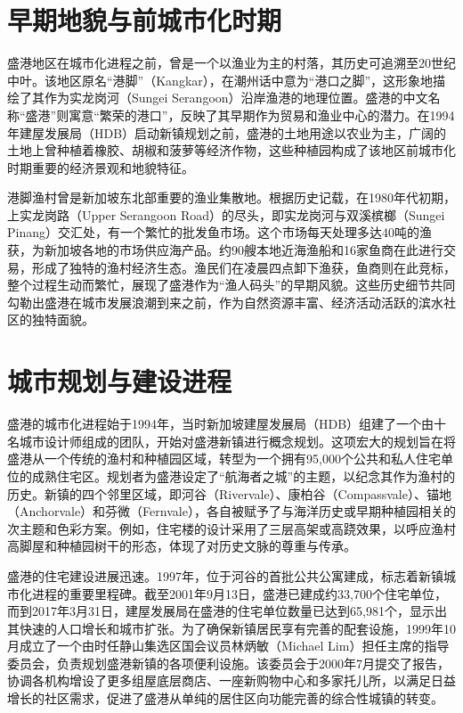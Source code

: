 \documentclass[11pt,a4paper,twoside,openany]{book}
\begin{document}
\section{早期地貌与前城市化时期}
盛港地区在城市化进程之前，曾是一个以渔业为主的村落，其历史可追溯至20世纪中叶。该地区原名“港脚”（Kangkar），在潮州话中意为“港口之脚”，这形象地描绘了其作为实龙岗河（Sungei Serangoon）沿岸渔港的地理位置。盛港的中文名称“盛港”则寓意“繁荣的港口”，反映了其早期作为贸易和渔业中心的潜力。在1994年建屋发展局（HDB）启动新镇规划之前，盛港的土地用途以农业为主，广阔的土地上曾种植着橡胶、胡椒和菠萝等经济作物，这些种植园构成了该地区前城市化时期重要的经济景观和地貌特征。

港脚渔村曾是新加坡东北部重要的渔业集散地。根据历史记载，在1980年代初期，上实龙岗路（Upper Serangoon Road）的尽头，即实龙岗河与双溪槟榔（Sungei Pinang）交汇处，有一个繁忙的批发鱼市场。这个市场每天处理多达40吨的渔获，为新加坡各地的市场供应海产品。约90艘本地近海渔船和16家鱼商在此进行交易，形成了独特的渔村经济生态。渔民们在凌晨四点卸下渔获，鱼商则在此竞标，整个过程生动而繁忙，展现了盛港作为“渔人码头”的早期风貌。这些历史细节共同勾勒出盛港在城市发展浪潮到来之前，作为自然资源丰富、经济活动活跃的滨水社区的独特面貌。

\section{城市规划与建设进程}
盛港的城市化进程始于1994年，当时新加坡建屋发展局（HDB）组建了一个由十名城市设计师组成的团队，开始对盛港新镇进行概念规划。这项宏大的规划旨在将盛港从一个传统的渔村和种植园区域，转型为一个拥有95,000个公共和私人住宅单位的成熟住宅区。规划者为盛港设定了“航海者之城”的主题，以纪念其作为渔村的历史。新镇的四个邻里区域，即河谷（Rivervale）、康柏谷（Compassvale）、锚地（Anchorvale）和芬微（Fernvale），各自被赋予了与海洋历史或早期种植园相关的次主题和色彩方案。例如，住宅楼的设计采用了三层高架或高跷效果，以呼应渔村高脚屋和种植园树干的形态，体现了对历史文脉的尊重与传承。

盛港的住宅建设进展迅速。1997年，位于河谷的首批公共公寓建成，标志着新镇城市化进程的重要里程碑。截至2001年9月13日，盛港已建成约33,700个住宅单位，而到2017年3月31日，建屋发展局在盛港的住宅单位数量已达到65,981个，显示出其快速的人口增长和城市扩张。为了确保新镇居民享有完善的配套设施，1999年10月成立了一个由时任静山集选区国会议员林炳敏（Michael Lim）担任主席的指导委员会，负责规划盛港新镇的各项便利设施。该委员会于2000年7月提交了报告，协调各机构增设了更多组屋底层商店、一座新购物中心和多家托儿所，以满足日益增长的社区需求，促进了盛港从单纯的居住区向功能完善的综合性城镇的转变。
\end{document}

